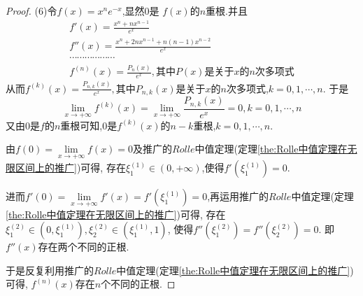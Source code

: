 \documentclass[lang=cn,newtx,10pt,scheme=chinese]{../Template/elegantbook}
\begin{document}
\begin{exercise}
\begin{proof}
    (6)令$f\left( x \right) =x^ne^{-x}$,显然$0$是
    $f(x)$的$n$重根.并且
    \begin{gather}
            f'\left( x \right) =\frac{x^n+nx^{n-1}}{e^x}
            \nonumber\\
f''\left( x \right) =\frac{x^n+2nx^{n-1}+n\left( n-1 \right) x^{n-2}}{e^x}
\nonumber\\
\cdots \cdots \cdots \cdots \cdots \cdots 
\nonumber\\
f^{\left( n \right)}\left( x \right) =\frac{P_n\left( x \right)}{e^x},\text{其中}P\left( x \right) \text{是关于}x\text{的}n\text{次多项式}
\nonumber
    \end{gather}
    从而$f^{\left( k \right)}\left( x \right) =\frac{P_{n,k}\left( x \right)}{e^x},\text{其中}P_{n,k}\left( x \right) \text{是关于}x\text{的}n\text{次多项式}$,$k=0,1,\cdots,n$.
    于是
    \begin{equation}
        \underset{x\rightarrow +\infty}{\lim}f^{\left( k \right)}\left( x \right) =\underset{x\rightarrow +\infty}{\lim}\frac{P_{n,k}\left( x \right)}{e^x}=0,k=0,1,\cdots ,n
        \nonumber
    \end{equation}
    又由0是$f$的$n$重根可知,$0$是$f^{\left( k \right)}\left( x \right)$的$n-k$重根,$k=0,1,\cdots,n$.

    由$f\left( 0 \right) =\underset{x\rightarrow +\infty}{\lim}f\left( x \right) =0$及推广的$Rolle$中值定理(定理\ref{the:Rolle中值定理在无限区间上的推广})可得,
    存在$\xi _{1}^{\left( 1 \right)}\in(0,+\infty)$,使得$f'(\xi _{1}^{\left( 1 \right)})=0$.
    
    进而$f'\left( 0 \right) =\underset{x\rightarrow +\infty}{\lim}f'\left( x \right) =f'\left( \xi _{1}^{\left( 1 \right)} \right) =0$,再运用推广的$Rolle$中值定理(定理\ref{the:Rolle中值定理在无限区间上的推广})可得,
    存在$\xi _{1}^{\left( 2 \right)}\in \left( 0,\xi _{1}^{\left( 1 \right)} \right) ,\xi _{2}^{\left( 2 \right)}\in \left( \xi _{1}^{\left( 1 \right)},1 \right) $,
    使得$f''\left( \xi _{1}^{\left( 2 \right)} \right) =f''\left( \xi _{2}^{\left( 2 \right)} \right) =0$.
    即$f''(x)$存在两个不同的正根.

    于是反复利用推广的$Rolle$中值定理(定理\ref{the:Rolle中值定理在无限区间上的推广})可得,
    $f^{(n)}(x)$存在$n$个不同的正根.

\end{proof}
\end{exercise}
\end{document}
